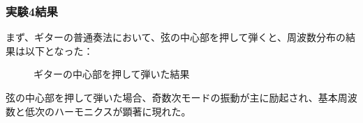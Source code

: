 \documentclass{article}
\begin{document}
\subsubsection{実験4結果}
\begin{spacing}{1.2}
    まず、ギターの普通奏法において、弦の中心部を押して弾くと、周波数分布の結果は以下となった：
    \begin{figure}[ht] %
        \centering
        \caption{ギターの中心部を押して弾いた結果}
    \end{figure}
    \FloatBarrier
    弦の中心部を押して弾いた場合、奇数次モードの振動が主に励起され、基本周波数と低次のハーモニクスが顕著に現れた。


\end{spacing}
\end{document}
